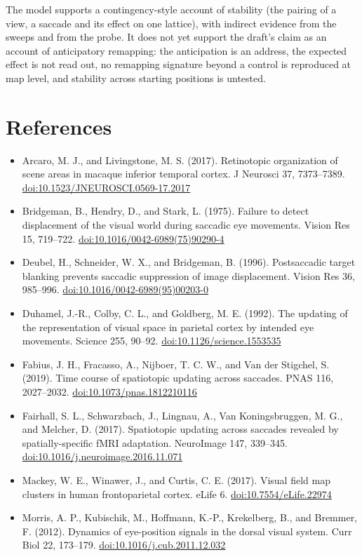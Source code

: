 \documentclass[11pt,a4paper]{article}
\newcommand{\doi}[1]{\href{https://doi.org/#1}{doi:#1}}
\begin{document}
The model supports a contingency-style account of stability (the pairing of a view,
a saccade and its effect on one lattice), with indirect evidence from the sweeps and
from the probe. It does not yet support the draft's claim as an account of
anticipatory remapping: the anticipation is an address, the expected effect is not
read out, no remapping signature beyond a control is reproduced at map level, and stability across starting
positions is untested.

\section*{References}

\begin{itemize}[itemsep=1pt,topsep=2pt]\small
  \item Arcaro, M. J., and Livingstone, M. S. (2017). Retinotopic organization of scene areas in macaque inferior temporal cortex. J Neurosci 37, 7373--7389. \doi{10.1523/JNEUROSCI.0569-17.2017}
  \item Bridgeman, B., Hendry, D., and Stark, L. (1975). Failure to detect displacement of the visual world during saccadic eye movements. Vision Res 15, 719--722. \doi{10.1016/0042-6989(75)90290-4}
  \item Deubel, H., Schneider, W. X., and Bridgeman, B. (1996). Postsaccadic target blanking prevents saccadic suppression of image displacement. Vision Res 36, 985--996. \doi{10.1016/0042-6989(95)00203-0}
  \item Duhamel, J.-R., Colby, C. L., and Goldberg, M. E. (1992). The updating of the representation of visual space in parietal cortex by intended eye movements. Science 255, 90--92. \doi{10.1126/science.1553535}
  \item Fabius, J. H., Fracasso, A., Nijboer, T. C. W., and Van der Stigchel, S. (2019). Time course of spatiotopic updating across saccades. PNAS 116, 2027--2032. \doi{10.1073/pnas.1812210116}
  \item Fairhall, S. L., Schwarzbach, J., Lingnau, A., Van Koningsbruggen, M. G., and Melcher, D. (2017). Spatiotopic updating across saccades revealed by spatially-specific fMRI adaptation. NeuroImage 147, 339--345. \doi{10.1016/j.neuroimage.2016.11.071}
  \item Mackey, W. E., Winawer, J., and Curtis, C. E. (2017). Visual field map clusters in human frontoparietal cortex. eLife 6. \doi{10.7554/eLife.22974}
  \item Morris, A. P., Kubischik, M., Hoffmann, K.-P., Krekelberg, B., and Bremmer, F. (2012). Dynamics of eye-position signals in the dorsal visual system. Curr Biol 22, 173--179. \doi{10.1016/j.cub.2011.12.032}

\end{itemize}
\end{document}
